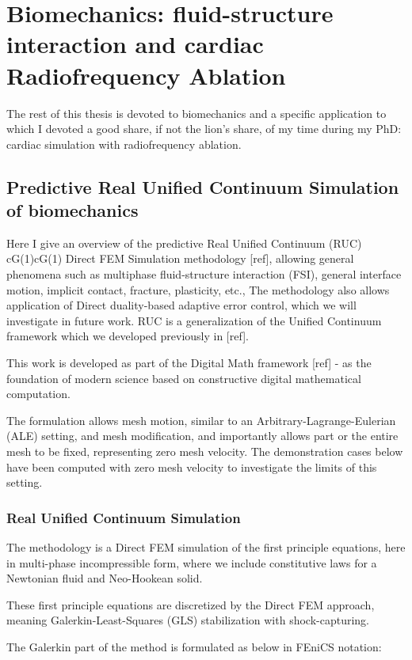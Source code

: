 \chapter{Biomechanics: fluid-structure interaction and cardiac Radiofrequency Ablation}
\label{cha_rfa}
The rest of this thesis is devoted to biomechanics and a specific
application to which I devoted a good share, if not the lion's share,
of my time during my PhD: cardiac simulation with radiofrequency
ablation.

\section{Predictive Real Unified Continuum Simulation of biomechanics}

Here I give an overview of the predictive Real Unified Continuum (RUC)
cG(1)cG(1) Direct FEM Simulation methodology [ref], allowing general
phenomena such as multiphase fluid-structure interaction (FSI),
general interface motion, implicit contact, fracture, plasticity,
etc., The methodology also allows application of Direct duality-based
adaptive error control, which we will investigate in future work. RUC
is a generalization of the Unified Continuum framework which we
developed previously in [ref].

This work is developed as part of the Digital Math framework [ref] - as
the foundation of modern science based on constructive digital
mathematical computation.

The formulation allows mesh motion, similar to an
Arbitrary-Lagrange-Eulerian (ALE) setting, and mesh modification, and
importantly allows part or the entire mesh to be fixed, representing
zero mesh velocity. The demonstration cases below have been computed
with zero mesh velocity to investigate the limits of this setting.

\subsection{Real Unified Continuum Simulation}

The methodology is a Direct FEM simulation of the first principle
equations, here in multi-phase incompressible form, where we include
constitutive laws for a Newtonian fluid and Neo-Hookean solid.

These first principle equations are discretized by the Direct FEM
approach, meaning Galerkin-Least-Squares (GLS) stabilization with
shock-capturing.

The Galerkin part of the method is formulated as below in FEniCS
notation:

